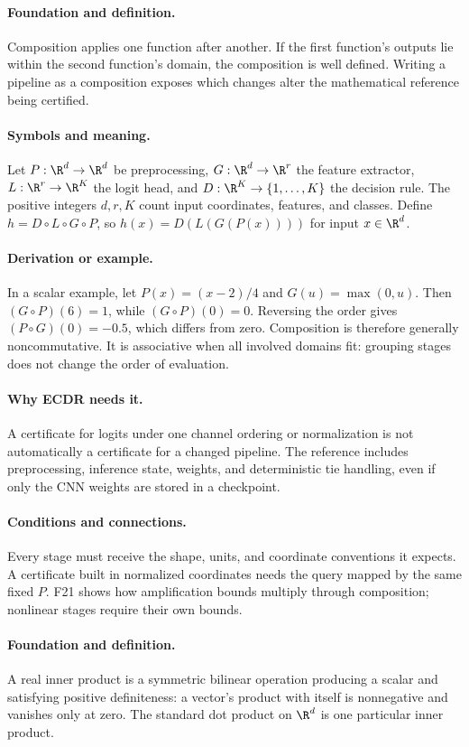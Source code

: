 \paragraph{Foundation and definition.}
Composition applies one function after another. If the first function's
outputs lie within the second function's domain, the composition is
well defined. Writing a pipeline as a composition exposes which changes
alter the mathematical reference being certified.
\paragraph{Symbols and meaning.}
Let $P:\R^{d}\to\R^{d}$ be preprocessing,
$G:\R^{d}\to\R^{r}$ the feature extractor,
$L:\R^{r}\to\R^{K}$ the logit head, and
$D:\R^{K}\to\{1,\ldots,K\}$ the decision rule. The positive
integers $d,r,K$ count input coordinates, features, and classes.
Define $h=D\circ L\circ G\circ P$, so
$h(x)=D(L(G(P(x))))$ for input $x\in\R^d$.
\paragraph{Derivation or example.}
In a scalar example, let $P(x)=(x-2)/4$ and $G(u)=\max(0,u)$.
Then $(G\circ P)(6)=1$, while $(G\circ P)(0)=0$.
Reversing the order gives $(P\circ G)(0)=-0.5$, which differs from
zero. Composition is therefore generally noncommutative. It is
associative when all involved domains fit: grouping stages does not
change the order of evaluation.
\paragraph{Why ECDR needs it.}
A certificate for logits under one channel ordering or normalization is
not automatically a certificate for a changed pipeline. The reference
includes preprocessing, inference state, weights, and deterministic tie
handling, even if only the CNN weights are stored in a checkpoint.
\paragraph{Conditions and connections.}
Every stage must receive the shape, units, and coordinate conventions it
expects. A certificate built in normalized coordinates needs the query
mapped by the same fixed $P$. F21 shows how amplification bounds
multiply through composition; nonlinear stages require their own bounds.

\paragraph{Foundation and definition.}
A real inner product is a symmetric bilinear operation producing a
scalar and satisfying positive definiteness: a vector's product with
itself is nonnegative and vanishes only at zero. The standard dot
product on $\R^d$ is one particular inner product.
